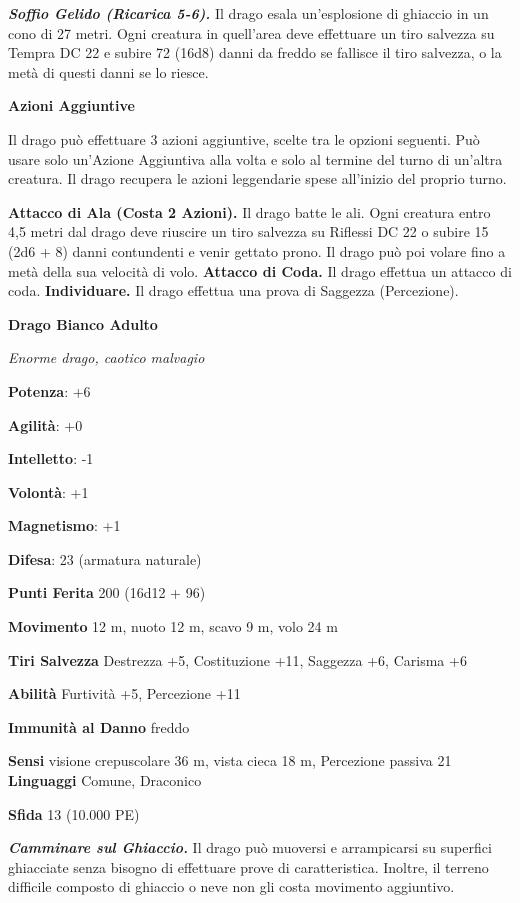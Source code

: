 \begin{multicols}{2}
\emph{\textbf{Soffio Gelido (Ricarica 5-6).}} Il drago esala
un'esplosione di ghiaccio in un cono di 27 metri. Ogni creatura in
quell'area deve effettuare un tiro salvezza su Tempra DC 22 e
subire 72 (16d8) danni da freddo se fallisce il tiro salvezza, o la metà
di questi danni se lo riesce.

\textbf{Azioni Aggiuntive}

Il drago può effettuare 3 azioni aggiuntive, scelte tra le opzioni
seguenti. Può usare solo un'Azione Aggiuntiva alla volta e solo al
termine del turno di un'altra creatura. Il drago recupera le azioni
leggendarie spese all'inizio del proprio turno.

\textbf{Attacco di Ala (Costa 2 Azioni).} Il drago batte le ali. Ogni
creatura entro 4,5 metri dal drago deve riuscire un tiro salvezza su Riflessi DC 22 o subire 15 (2d6 + 8) danni contundenti e venir gettato
prono. Il drago può poi volare fino a metà della sua velocità di volo.
\textbf{Attacco di Coda.} Il drago effettua un attacco di coda.
\textbf{Individuare.} Il drago effettua una prova di Saggezza
(Percezione).

\textbf{Drago Bianco Adulto}

\emph{Enorme drago, caotico malvagio}

\textbf{Potenza}: +6

\textbf{Agilità}: +0

\textbf{Intelletto}: -1

\textbf{Volontà}: +1

\textbf{Magnetismo}: +1

\textbf{Difesa}: 23 (armatura naturale)

\textbf{Punti Ferita} 200 (16d12 + 96)

\textbf{Movimento} 12 m, nuoto 12 m, scavo 9 m, volo 24 m

\textbf{Tiri Salvezza} Destrezza +5, Costituzione +11, Saggezza +6,
Carisma +6

\textbf{Abilità} Furtività +5, Percezione +11

\textbf{Immunità al Danno} freddo

\textbf{Sensi} visione crepuscolare 36 m, vista cieca 18 m, Percezione passiva
21 \textbf{Linguaggi} Comune, Draconico

\textbf{Sfida} 13 (10.000 PE)

\emph{\textbf{Camminare sul Ghiaccio.}} Il drago può muoversi e
arrampicarsi su superfici ghiacciate senza bisogno di effettuare prove
di caratteristica. Inoltre, il terreno difficile composto di ghiaccio o
neve non gli costa movimento aggiuntivo.


\end{multicols}
